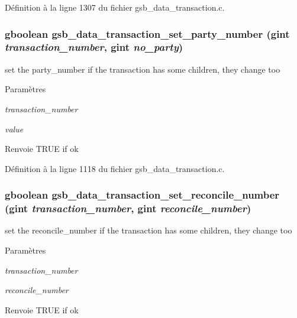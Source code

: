Définition à la ligne 1307 du fichier gsb\_\-data\_\-transaction.c.

\subsubsection[{gsb\_\-data\_\-transaction\_\-set\_\-party\_\-number}]{\setlength{\rightskip}{0pt plus 5cm}gboolean gsb\_\-data\_\-transaction\_\-set\_\-party\_\-number (gint {\em transaction\_\-number}, \/  gint {\em no\_\-party})}\label{gsb__data__transaction_8h_ae334be534c1cfcc7dacf260008ee49f2}
set the party\_\-number if the transaction has some children, they change too


\begin{DoxyParams}{Paramètres}
\item[{\em transaction\_\-number}]\item[{\em value}]\end{DoxyParams}
\begin{DoxyReturn}{Renvoie}
TRUE if ok 
\end{DoxyReturn}


Définition à la ligne 1118 du fichier gsb\_\-data\_\-transaction.c.

\subsubsection[{gsb\_\-data\_\-transaction\_\-set\_\-reconcile\_\-number}]{\setlength{\rightskip}{0pt plus 5cm}gboolean gsb\_\-data\_\-transaction\_\-set\_\-reconcile\_\-number (gint {\em transaction\_\-number}, \/  gint {\em reconcile\_\-number})}\label{gsb__data__transaction_8h_ab8a486754eb6b78bc3eaf156de7cec3f}
set the reconcile\_\-number if the transaction has some children, they change too


\begin{DoxyParams}{Paramètres}
\item[{\em transaction\_\-number}]\item[{\em reconcile\_\-number}]\end{DoxyParams}
\begin{DoxyReturn}{Renvoie}
TRUE if ok 
\end{DoxyReturn}


